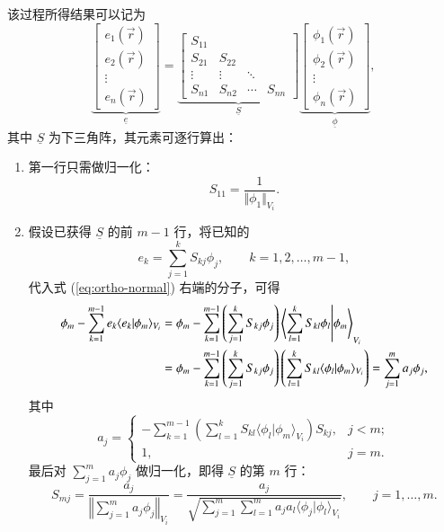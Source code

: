 该过程所得结果可以记为
\begin{equation}
\underbrace{\begin{bmatrix}e_{1}(\vec{r})\\
e_{2}(\vec{r})\\
\vdots\\
e_{n}(\vec{r})
\end{bmatrix}}_{\underline{e}}=\underbrace{\begin{bmatrix}S_{11}\\
S_{21} & S_{22}\\
\vdots & \vdots & \ddots\\
S_{n1} & S_{n2} & \cdots & S_{nn}
\end{bmatrix}}_{\underline{S}}\underbrace{\begin{bmatrix}\phi_{1}(\vec{r})\\
\phi_{2}(\vec{r})\\
\vdots\\
\phi_{n}(\vec{r})
\end{bmatrix}}_{\underline{\phi}},
\end{equation}
其中 $\underline{S}$ 为下三角阵，其元素可逐行算出：
\begin{enumerate}[wide]
\item 第一行只需做归一化：
\begin{equation}
S_{11}=\frac{1}{\Vert\phi_{1}\Vert_{V_{i}}}.
\end{equation}
\item 假设已获得 $\underline{S}$ 的前 $m-1$ 行，将已知的
\begin{equation}
e_{k}=\sum_{j=1}^{k}S_{kj}\phi_{j},\qquad k=1,2,\dots,m-1,\label{eq:partially_orthonormal}
\end{equation}
代入式 (\ref{eq:ortho-normal}) 右端的分子，可得
\begin{equation}
\begin{aligned}\phi_{m}-\sum_{k=1}^{m-1}e_{k}\langle e_{k}\vert\phi_{m}\rangle_{V_{i}} & =\phi_{m}-\sum_{k=1}^{m-1}\left(\sum_{j=1}^{k}S_{kj}\phi_{j}\right)\ip{\sum_{l=1}^{k}S_{kl}\phi_{l}}{\phi_{m}}_{V_{i}}\\
 & =\phi_{m}-\sum_{k=1}^{m-1}\left(\sum_{j=1}^{k}S_{kj}\phi_{j}\right)\left(\sum_{l=1}^{k}S_{kl}\langle\phi_{l}\vert\phi_{m}\rangle_{V_{i}}\right)=\sum_{j=1}^{m}a_{j}\phi_{j},
\end{aligned}
\end{equation}
其中
\begin{equation}
a_{j}=\begin{cases}
-\sum_{k=1}^{m-1}\left(\sum_{l=1}^{k}S_{kl}\langle\phi_{l}\vert\phi_{m}\rangle_{V_{i}}\right)S_{kj}, & j<m;\\
1, & j=m.
\end{cases}
\end{equation}
最后对 $\sum_{j=1}^{m}a_{j}\phi_{j}$ 做归一化，即得 $\underline{S}$ 的第 $m$
行：
\begin{equation}
S_{mj}=\frac{a_{j}}{\left\Vert \sum_{j=1}^{m}a_{j}\phi_{j}\right\Vert _{V_{i}}}=\frac{a_{j}}{\sqrt{\sum_{j=1}^{m}\sum_{l=1}^{m}a_{j}a_{l}\langle\phi_{j}\vert\phi_{l}\rangle_{V_{i}}}},\qquad j=1,\dots,m.
\end{equation}
\end{enumerate}

